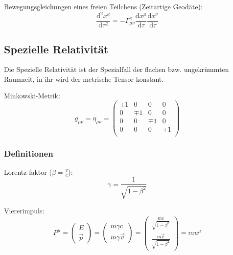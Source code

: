 \documentclass[11pt]{article}
\numberwithin{equation}{section}
\begin{document}
          Bewegungsgleichungen eines freien Teilchens (Zeitartige Geodäte):
          \begin{equation}
            \frac{\mathrm{d}^2 x^\kappa}{\mathrm{d}\tau^2}=-\Gamma_{\mu\nu}^{\kappa}\frac{\mathrm{d}x^\mu}{\mathrm{d}\tau}\frac{\mathrm{d}x^\nu}{\mathrm{d}\tau}
          \end{equation}

      \subsection{Spezielle Relativität}
        Die Spezielle Relativität ist der Spezialfall der flachen bzw. ungekrümmten Raumzeit, in ihr wird der metrische Tensor konstant.

        Minkowski-Metrik:
        \begin{equation}
          g_{\mu\nu} = \eta_{\mu\nu}
          = \left( \begin{matrix}
            \pm1 & 0    & 0    & 0    \\
            0    & \mp1 & 0    & 0    \\
            0    & 0    & \mp1 & 0    \\
            0    & 0    & 0    & \mp1 \\
          \end{matrix} \right)
        \end{equation}

        \subsubsection{Definitionen}
          Lorentz-faktor ($\beta = \frac{v}{c}$):
          \begin{equation}
            \gamma = \frac{1}{\sqrt{1-\beta^2}}
          \end{equation}

          Viererimpuls:
          \begin{equation}
            P^\mu =
            \left(\begin{matrix}
              E \\ \vec{p}
            \end{matrix}\right)
            = \left(\begin{matrix}
              m\gamma c \\ m\gamma\vec{v}
            \end{matrix}\right)
            = \left(\begin{matrix}
              \frac{mc}{\sqrt{1-\beta^2}} \\ \frac{m\vec{v}}{\sqrt{1-\beta^2}}
            \end{matrix}\right)
            = m u^\mu
          \end{equation}
\end{document}
